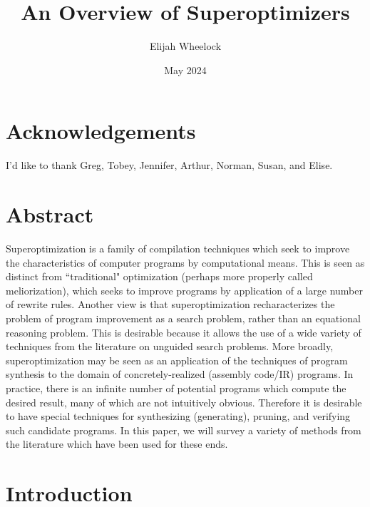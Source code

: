 \documentclass[12pt,twoside]{reedthesis}
\title{An Overview of Superoptimizers}
\author{Elijah Wheelock}
\date{May 2024}
\begin{document}
\maketitle
\frontmatter %
\pagestyle{empty} %
\chapter*{Acknowledgements} %
I'd like to thank Greg, Tobey, Jennifer, Arthur, Norman, Susan, and Elise.
\tableofcontents

\chapter*{Abstract} %
    Superoptimization is a family of compilation techniques which seek to improve the characteristics of computer programs by computational means.
    This is seen as distinct from ``traditional" optimization (perhaps more properly called meliorization), which seeks to improve programs by application of a large number of rewrite rules.
    Another view is that superoptimization recharacterizes the problem of program improvement as a search problem, rather than an equational reasoning problem.
    This is desirable because it allows the use of a wide variety of techniques from the literature on unguided search problems.
    More broadly, superoptimization may be seen as an application of the techniques of program synthesis to the domain of concretely-realized (assembly code/IR) programs.
    In practice, there is an infinite number of potential programs which compute the desired result, many of which are not intuitively obvious.
    Therefore it is desirable to have special techniques for synthesizing (generating), pruning, and verifying such candidate programs. 
    In this paper, we will survey a variety of methods from the literature which have been used for these ends.

\mainmatter %
\pagestyle{fancyplain} %
\chapter*{Introduction} %
    \singlespacing %
    
\end{document}
